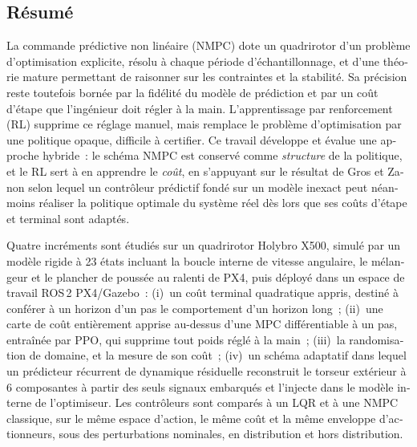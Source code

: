 \documentclass[11pt,a4paper,twoside,openright]{report}
\newenvironment{frenchpart}{\begin{otherlanguage}{french}}{\end{otherlanguage}}%
\newenvironment{frenchpart}{}{}%
\theoremstyle{plain}
\theoremstyle{definition}
\theoremstyle{remark}
\begin{document}
	\begin{frenchpart}
		\chapter*{R\'esum\'e}

		\noindent
		La commande pr\'edictive non lin\'eaire (NMPC) dote un quadrirotor d'un probl\`eme
		d'optimisation explicite, r\'esolu \`a chaque p\'eriode d'\'echantillonnage, et
		d'une th\'eorie mature permettant de raisonner sur les contraintes et la
		stabilit\'e. Sa pr\'ecision reste toutefois born\'ee par la fid\'elit\'e du
		mod\`ele de pr\'ediction et par un co\^ut d'\'etape que l'ing\'enieur doit
		r\'egler \`a la main. L'apprentissage par renforcement (RL) supprime ce
		r\'eglage manuel, mais remplace le probl\`eme d'optimisation par une politique
		opaque, difficile \`a certifier. Ce travail d\'eveloppe et \'evalue une approche
		hybride~: le sch\'ema NMPC est conserv\'e comme \emph{structure} de la
		politique, et le RL sert \`a en apprendre le \emph{co\^ut}, en s'appuyant sur le
		r\'esultat de Gros et Zanon selon lequel un contr\^oleur pr\'edictif fond\'e sur
		un mod\`ele inexact peut n\'eanmoins r\'ealiser la politique optimale du
		syst\`eme r\'eel d\`es lors que ses co\^uts d'\'etape et terminal sont adapt\'es.

		Quatre incr\'ements sont \'etudi\'es sur un quadrirotor Holybro X500, simul\'e
		par un mod\`ele rigide \`a \num{23} \'etats incluant la boucle interne de
		vitesse angulaire, le m\'elangeur et le plancher de pouss\'ee au ralenti de
		PX4, puis d\'eploy\'e dans un espace de travail ROS\,2 PX4/Gazebo~: (i)~un
		co\^ut terminal quadratique appris, destin\'e \`a conf\'erer \`a un horizon
		d'un pas le comportement d'un horizon long~; (ii)~une carte de co\^ut
		enti\`erement apprise au-dessus d'une MPC diff\'erentiable \`a un pas,
		entra\^in\'ee par PPO, qui supprime tout poids r\'egl\'e \`a la main~;
		(iii)~la randomisation de domaine, et la mesure de son co\^ut~; (iv)~un
		sch\'ema adaptatif dans lequel un pr\'edicteur r\'ecurrent de dynamique
		r\'esiduelle reconstruit le torseur ext\'erieur \`a \num{6} composantes \`a
		partir des seuls signaux embarqu\'es et l'injecte dans le mod\`ele interne de
		l'optimiseur. Les contr\^oleurs sont compar\'es \`a un LQR et \`a une NMPC
		classique, sur le m\^eme espace d'action, le m\^eme co\^ut et la m\^eme
		enveloppe d'actionneurs, sous des perturbations nominales, en distribution et
		hors distribution.


\end{frenchpart}
\end{document}
